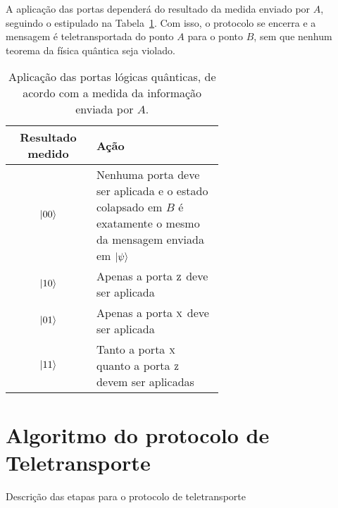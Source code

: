 A aplicação das portas dependerá do resultado da medida enviado por \(A\), seguindo o estipulado na Tabela~\ref{tab:acao-das-portas}. Com isso, o protocolo se encerra e a mensagem é teletransportada do ponto \(A\) para o ponto \(B\), sem que nenhum teorema da física quântica seja violado.

\begin{table}[ht!]
  \centering
  \caption{Aplicação das portas lógicas quânticas, de acordo com a medida da informação enviada por \(A\).}\label{tab:acao-das-portas}
  \begin{tabular}{cp{0.6\linewidth}}
    \toprule
    \textbf{Resultado medido} & \textbf{Ação} \\
    \midrule
    $\ket{00}$ & Nenhuma porta deve ser aplicada e o estado colapsado em \(B\) é exatamente o mesmo da mensagem enviada em $\ket{\psi}$ \\
    $\ket{10}$ & Apenas a porta \(\operatorname{\textsc{z}}\) deve ser aplicada \\
    $\ket{01}$ & Apenas a porta \(\operatorname{\textsc{x}}\) deve ser aplicada \\
    $\ket{11}$ & Tanto a porta \(\operatorname{\textsc{x}}\) quanto a porta \(\operatorname{\textsc{z}}\) devem ser aplicadas \\
    \bottomrule
  \end{tabular}
\end{table}


\section{Algoritmo do protocolo de Teletransporte}

Descrição das etapas para o protocolo de teletransporte

